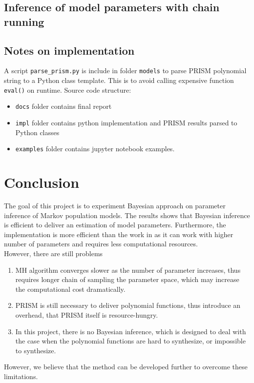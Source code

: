 \documentclass[12pt]{article}
\theoremstyle{definition}
\begin{document}
\subsection{Inference of model parameters with chain running}

\subsection{Notes on implementation}
A script \texttt{parse\_prism.py} is include in folder \texttt{models} to parse
PRISM polynomial string to a Python class template. This is to avoid calling
expensive function \texttt{eval()} on runtime. Source code structure:
\begin{itemize}
\item \texttt{docs} folder contains final report
\item \texttt{impl} folder contains python implementation and PRISM results
  parsed to Python classes
\item \texttt{examples} folder contains jupyter notebook examples.
\end{itemize}

\section{Conclusion}
The goal of this project is to experiment Bayesian approach on parameter
inference of Markov population models. The results shows that Bayesian inference
is efficient to deliver an estimation of model parameters. Furthermore, the
implementation is more efficient than the work in \cite{hajnal2019data} as it
can work with higher number of parameters and requires less computational
resources.\\
However, there are still problems
\begin{enumerate}
\item MH algorithm converges slower as the number of parameter increases, thus
  requires longer chain of sampling the parameter space, which may increase the
  computational cost dramatically.
\item PRISM is still necessary to deliver polynomial functions, thus introduce
  an overhead, that PRISM itself is resource-hungry.
\item In this project, there is no Bayesian inference, which is designed to deal
  with the case when the polynomial functions are hard to synthesize, or
  impossible to synthesize.
\end{enumerate}
However, we believe that the method can be developed further to overcome these limitations.


\printbibliography
\end{document}
